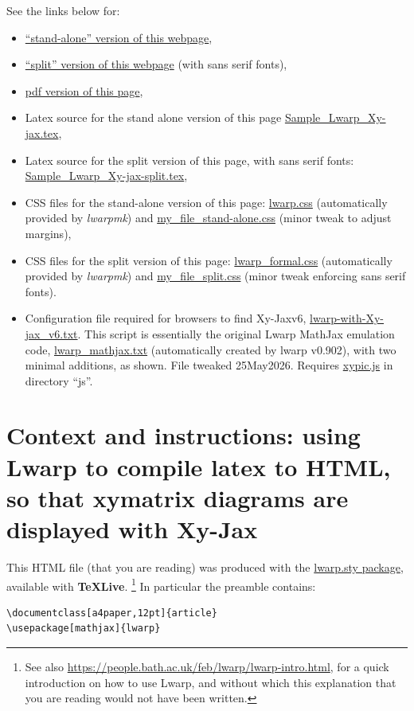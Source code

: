 \documentclass[a4paper,12pt]{article}
\newtheorem{Fundamental Theorem}{Fundamental Theorem}
\begin{document}
See the links below for:
\begin{itemize}
   \item \href{Sample_Lwarp_Xy-jax.html}{``stand-alone'' version of this webpage},
   \item \href{Sample_Lwarp_Xy-jax-split-index.html}{``split'' version of this webpage} (with sans serif fonts),
    \item \href{Sample_Lwarp_Xy-jax.pdf}{pdf version of this page},
   \item Latex source for the stand alone version of this page \href{Sample_Lwarp_Xy-jax.tex}{Sample\_Lwarp\_Xy-jax.tex},
    \item Latex source for the split version of this page, with sans serif fonts: \href{Sample_Lwarp_Xy-jax-split.tex}{Sample\_Lwarp\_Xy-jax-split.tex},
   \item CSS files for the stand-alone version of this page: \href{lwarp.css}{lwarp.css} (automatically provided by \emph{lwarpmk}) and \href{my_file_stand-alone.css}{my\_file\_stand-alone.css} (minor tweak to adjust margins),
   \item CSS files for the split version of this page: \href{lwarp\_formal.css}{lwarp\_formal.css} (automatically provided by \emph{lwarpmk}) and \href{my_file_split.css}{my\_file\_split.css} (minor tweak enforcing sans serif fonts).
   \item Configuration file required for browsers to find Xy-Jaxv6,
\href{lwarp-with-Xy-jax_v6.txt}{lwarp-with-Xy-jax\_v6.txt}. This script is essentially the original Lwarp MathJax emulation code, \href{lwarp_mathjax.txt}{lwarp\_mathjax.txt}  (automatically created by  lwarp v0.902), with two minimal additions, as shown. File tweaked 25May2026. Requires \href{https://raw.githubusercontent.com/sonoisa/XyJax-v3/master/build/xypic.js}{xypic.js} in directory ``js''.
\end{itemize}


\section{Context and instructions: using Lwarp to compile latex to HTML, so that xymatrix diagrams are displayed with Xy-Jax}\label{Context}

\noindent This HTML file (that you are reading) was produced with the
\href{https://ctan.org/pkg/lwarp}{lwarp.sty package}, available with \textbf{TeXLive}.
\medskip
\footnote{See also \url{https://people.bath.ac.uk/feb/lwarp/lwarp-intro.html}, for a quick introduction on how to use Lwarp, and without which this explanation that you are reading would not have been written.}
\medskip
In particular the preamble contains:
\begin{verbatim}
\documentclass[a4paper,12pt]{article}
\usepackage[mathjax]{lwarp}
\end{verbatim}
\end{document}
